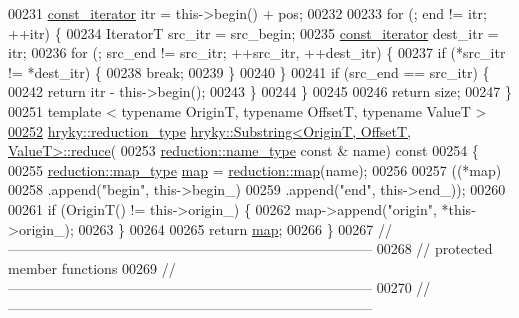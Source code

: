 \begin{DoxyCode}
00231     \hyperlink{classhryky_1_1iterator_1_1random_1_1_immutable}{const_iterator} itr          = this->begin() + pos;
00232 
00233     \textcolor{keywordflow}{for} (; end != itr; ++itr) \{
00234         IteratorT src\_itr       = src\_begin;
00235         \hyperlink{classhryky_1_1iterator_1_1random_1_1_immutable}{const_iterator} dest\_itr = itr;
00236         \textcolor{keywordflow}{for} (; src\_end != src\_itr; ++src\_itr, ++dest\_itr) \{
00237             \textcolor{keywordflow}{if} (*src\_itr != *dest\_itr) \{
00238                 \textcolor{keywordflow}{break};
00239             \}
00240         \}
00241         \textcolor{keywordflow}{if} (src\_end == src\_itr) \{
00242             \textcolor{keywordflow}{return} itr - this->begin();
00243         \}
00244     \}
00245 
00246     \textcolor{keywordflow}{return} size;
00247 \}
00251 \textcolor{keyword}{template} < \textcolor{keyword}{typename} OriginT, \textcolor{keyword}{typename} OffsetT, \textcolor{keyword}{typename} ValueT >
\hypertarget{substring_8h_source_l00252}{}\hyperlink{classhryky_1_1_substring_a816bb8132b58784093f42b812ef8f2ca}{00252} \hyperlink{classhryky_1_1_intrusive_ptr}{hryky::reduction_type} \hyperlink{namespacehryky_af41cb3af6766761da0ff21b84527a52c}{hryky::Substring<OriginT, OffsetT, ValueT>::reduce}(
00253     \hyperlink{classhryky_1_1reduction_1_1_string}{reduction::name_type} \textcolor{keyword}{const} & name)\textcolor{keyword}{ const}
00254 \textcolor{keyword}{}\{
00255     \hyperlink{classhryky_1_1_intrusive_ptr}{reduction::map_type} \hyperlink{namespacehryky_1_1reduction_ac5eae270cf8047b294dc4ff3e5e11a79}{map} = \hyperlink{namespacehryky_1_1reduction_ac5eae270cf8047b294dc4ff3e5e11a79}{reduction::map}(name);
00256 
00257     ((*map)
00258      .append(\textcolor{stringliteral}{"begin"},   this->begin\_)
00259      .append(\textcolor{stringliteral}{"end"},     this->end\_));
00260 
00261     \textcolor{keywordflow}{if} (OriginT() != this->origin\_) \{
00262         map->append(\textcolor{stringliteral}{"origin"},   *this->origin\_);
00263     \}
00264     
00265     \textcolor{keywordflow}{return} \hyperlink{namespacehryky_1_1reduction_ac5eae270cf8047b294dc4ff3e5e11a79}{map};
00266 \}
00267 \textcolor{comment}{//
      ------------------------------------------------------------------------------}
00268 \textcolor{comment}{// protected member functions}
00269 \textcolor{comment}{//
      ------------------------------------------------------------------------------}
00270 \textcolor{comment}{//
      ------------------------------------------------------------------------------}

\end{DoxyCode}
